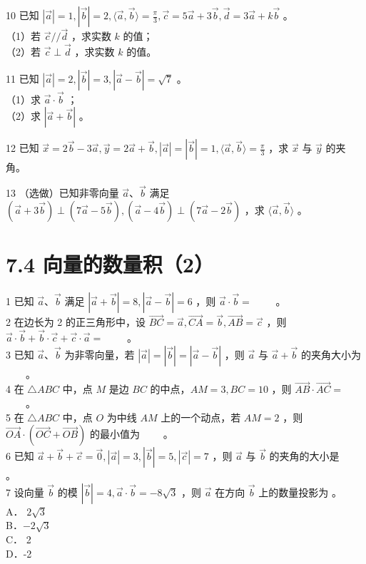 \documentclass[10pt]{article}
\begin{document}
10 已知 \(|\vec{a}|=1,|\vec{b}|=2,\langle\vec{a}, \vec{b}\rangle=\frac{\pi}{3}, \vec{c}=5 \vec{a}+3 \vec{b}, \vec{d}=3 \vec{a}+k \vec{b}\) 。\\
（1）若 \(\vec{c} / / \vec{d}\) ，求实数 \(k\) 的值；\\
（2）若 \(\vec{c} \perp \vec{d}\) ，求实数 \(k\) 的值。

11 已知 \(|\vec{a}|=2,|\vec{b}|=3,|\vec{a}-\vec{b}|=\sqrt{7}\) 。\\
（1）求 \(\vec{a} \cdot \vec{b}\) ；\\
（2）求 \(|\vec{a}+\vec{b}|\) 。

12 已知 \(\vec{x}=2 \vec{b}-3 \vec{a}, \vec{y}=2 \vec{a}+\vec{b},|\vec{a}|=|\vec{b}|=1,\langle\vec{a}, \vec{b}\rangle=\frac{\pi}{3}\) ，求 \(\vec{x}\) 与 \(\vec{y}\) 的夹角。

13 （选做）已知非零向量 \(\vec{a} 、 \vec{b}\) 满足 \((\vec{a}+3 \vec{b}) \perp(7 \vec{a}-5 \vec{b}),(\vec{a}-4 \vec{b}) \perp(7 \vec{a}-2 \vec{b})\) ，求 \(\langle\vec{a}, \vec{b}\rangle\) 。

\section*{7.4 向量的数量积（2）}
1 已知 \(\vec{a} 、 \vec{b}\) 满足 \(|\vec{a}+\vec{b}|=8,|\vec{a}-\vec{b}|=6\) ，则 \(\vec{a} \cdot \vec{b}=\) \(\qquad\)。\\
2 在边长为 2 的正三角形中，设 \(\overrightarrow{B C}=\vec{a}, \overrightarrow{C A}=\vec{b}, \overrightarrow{A B}=\vec{c}\) ，则 \(\vec{a} \cdot \vec{b}+\vec{b} \cdot \vec{c}+\vec{c} \cdot \vec{a}=\) \(\qquad\)。\\
3 已知 \(\vec{a} 、 \vec{b}\) 为非零向量，若 \(|\vec{a}|=|\vec{b}|=|\vec{a}-\vec{b}|\) ，则 \(\vec{a}\) 与 \(\vec{a}+\vec{b}\) 的夹角大小为 \(\qquad\)。\\
4 在 \(\triangle A B C\) 中，点 \(M\) 是边 \(B C\) 的中点，\(A M=3, B C=10\) ，则 \(\overrightarrow{A B} \cdot \overrightarrow{A C}=\) \(\qquad\)。\\
5 在 \(\triangle A B C\) 中，点 \(O\) 为中线 \(A M\) 上的一个动点，若 \(A M=2\) ，则 \(\overrightarrow{O A} \cdot(\overrightarrow{O C}+\overrightarrow{O B})\) 的最小值为 \(\qquad\)。\\
6 已知 \(\vec{a}+\vec{b}+\vec{c}=\overrightarrow{0},|\vec{a}|=3,|\vec{b}|=5,|\vec{c}|=7\) ，则 \(\vec{a}\) 与 \(\vec{b}\) 的夹角的大小是 \(\qquad\)。\\
7 设向量 \(\vec{b}\) 的模 \(|\vec{b}|=4, \vec{a} \cdot \vec{b}=-8 \sqrt{3}\) ，则 \(\vec{a}\) 在方向 \(\vec{b}\) 上的数量投影为 。\\
A． \(2 \sqrt{3}\)\\
B．\(-2 \sqrt{3}\)\\
C． 2\\
D．-2
\end{document}
